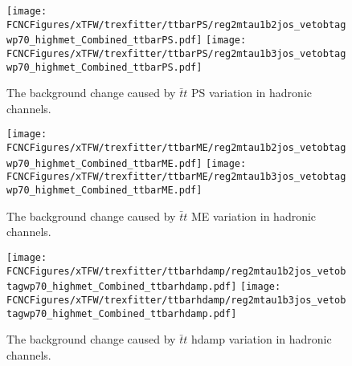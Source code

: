 \begin{figure}[H]
\centering
\texttt{[image: \\FCNCFigures/xTFW/trexfitter/ttbarPS/reg2mtau1b2jos\_vetobtagwp70\_highmet\_Combined\_ttbarPS.pdf]}
\texttt{[image: \\FCNCFigures/xTFW/trexfitter/ttbarPS/reg2mtau1b3jos\_vetobtagwp70\_highmet\_Combined\_ttbarPS.pdf]}
\caption{The background change caused by $\bar{t}t$ PS variation in hadronic channels.}
\label{fig:xTFW_ttbarPS}
\end{figure}

\begin{figure}[H]
\centering
\texttt{[image: \\FCNCFigures/xTFW/trexfitter/ttbarME/reg2mtau1b2jos\_vetobtagwp70\_highmet\_Combined\_ttbarME.pdf]}
\texttt{[image: \\FCNCFigures/xTFW/trexfitter/ttbarME/reg2mtau1b3jos\_vetobtagwp70\_highmet\_Combined\_ttbarME.pdf]}
\caption{The background change caused by $\bar{t}t$ ME variation in hadronic channels.}
\label{fig:xTFW_ttbarME}
\end{figure}

\begin{figure}[H]
\centering
\texttt{[image: \\FCNCFigures/xTFW/trexfitter/ttbarhdamp/reg2mtau1b2jos\_vetobtagwp70\_highmet\_Combined\_ttbarhdamp.pdf]}
\texttt{[image: \\FCNCFigures/xTFW/trexfitter/ttbarhdamp/reg2mtau1b3jos\_vetobtagwp70\_highmet\_Combined\_ttbarhdamp.pdf]}
\caption{The background change caused by $\bar{t}t$ hdamp variation in hadronic channels.}
\label{fig:xTFW_ttbarhdamp}
\end{figure}

\newpage